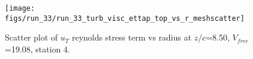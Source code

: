 \begin{figure}[H]
\centering
\texttt{[image: figs/run\_33/run\_33\_turb\_visc\_ettap\_top\_vs\_r\_meshscatter]}
\caption{Scatter plot of $
u_T$ reynolds stress term vs radius at $z/c$=8.50, $V_{free}$=19.08, station 4.}
\label{fig:run_33_turb_visc_ettap_top_vs_r_meshscatter}
\end{figure}


